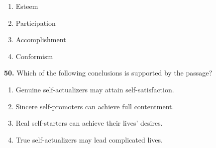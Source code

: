 \documentclass[12pt]{article}
\begin{document}
\begin{enumerate}[label=(\Alph*),leftmargin=*,itemsep=0.2em]
\item Esteem
\item Participation
\item Accomplishment
\item Conformism
\end{enumerate}
\par
\vspace{0.25\baselineskip}
\noindent\textbf{50.} Which of the following conclusions is supported by the passage?
\begin{enumerate}[label=(\Alph*),leftmargin=*,itemsep=0.2em]
\item Genuine self-actualizers may attain self-satisfaction.
\item Sincere self-promoters can achieve full contentment.
\item Real self-starters can achieve their lives' desires.
\item True self-actualizers may lead complicated lives.
\end{enumerate}
\par
\vspace{0.25\baselineskip}
\end{document}
